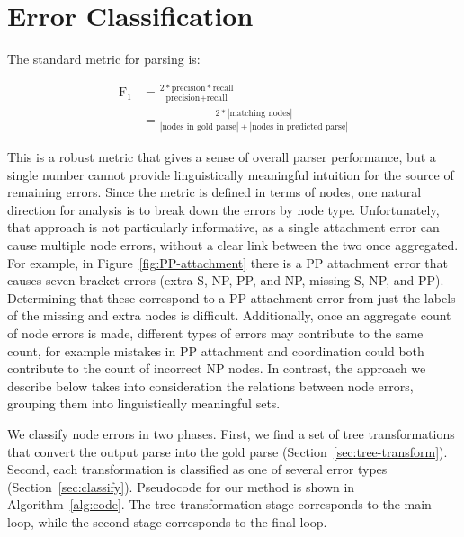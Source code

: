 \section{Error Classification} \label{sec:errors-intro}

The standard metric for parsing is:

\begin{align*}
  \text{F}_1 & = \frac{2 * \text{precision} * \text{recall}}{\text{precision} + \text{recall}} \\
            & = \frac{2 * |\text{matching nodes}|}{|\text{nodes in gold parse}| + |\text{nodes in predicted parse}|}
\end{align*}

This is a robust metric that gives a sense of overall parser performance, but a single number cannot provide linguistically meaningful intuition for the source of remaining errors.
Since the metric is defined in terms of nodes, one natural direction for analysis is to break down the errors by node type.
Unfortunately, that approach is not particularly informative, as a single attachment error can cause multiple node errors, without a clear link between the two once aggregated.
For example, in Figure~\ref{fig:PP-attachment} there is a PP attachment error that causes seven bracket errors (extra S, NP, PP, and NP, missing S, NP, and PP).
Determining that these correspond to a PP attachment error from just the labels of the missing and extra nodes is difficult.
Additionally, once an aggregate count of node errors is made, different types of errors may contribute to the same count, for example mistakes in PP attachment and coordination could both contribute to the count of incorrect NP nodes.
In contrast, the approach we describe below takes into consideration the relations between node errors, grouping them into linguistically meaningful sets.

We classify node errors in two phases.
First, we find a set of tree transformations that convert the output parse into the gold parse (Section~\ref{sec:tree-transform}).
Second, each transformation is classified as one of several error types (Section~\ref{sec:classify}).
Pseudocode for our method is shown in Algorithm~\ref{alg:code}.
The tree transformation stage corresponds to the main loop, while the second stage corresponds to the final loop.

